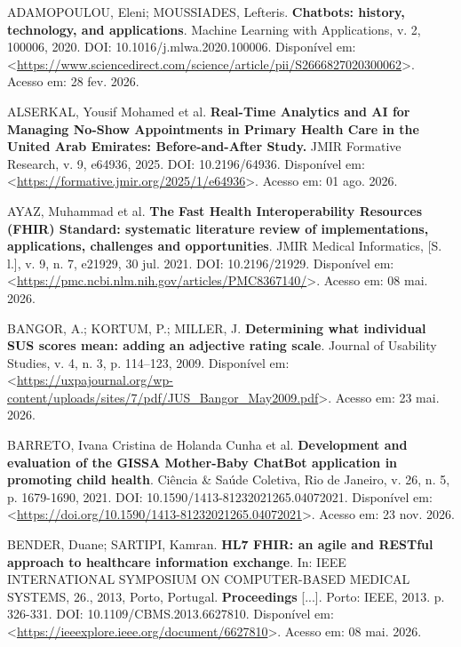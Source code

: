 \documentclass[12pt,a4paper]{extarticle}
\begin{document}
\vspace{0.5cm}\noindent
ADAMOPOULOU, Eleni; MOUSSIADES, Lefteris. \textbf{Chatbots: history, technology, and applications}. Machine Learning with Applications, v. 2, 100006, 2020. DOI: 10.1016/j.mlwa.2020.100006. Disponível em: <\url{https://www.sciencedirect.com/science/article/pii/S2666827020300062}>. Acesso em: 28 fev. 2026.

\vspace{0.5cm}\noindent
ALSERKAL, Yousif Mohamed et al. \textbf{Real-Time Analytics and AI for Managing No-Show Appointments in Primary Health Care in the United Arab Emirates: Before-and-After Study.} JMIR Formative Research, v. 9, e64936, 2025. DOI: 10.2196/64936. Disponível em: <\url{https://formative.jmir.org/2025/1/e64936}>. Acesso em: 01 ago. 2026.

\vspace{0.5cm}\noindent
AYAZ, Muhammad et al. \textbf{The Fast Health Interoperability Resources (FHIR) Standard: systematic literature review of implementations, applications, challenges and opportunities}. JMIR Medical Informatics, [S. l.], v. 9, n. 7, e21929, 30 jul. 2021. DOI: 10.2196/21929. Disponível em: <\url{https://pmc.ncbi.nlm.nih.gov/articles/PMC8367140/}>. Acesso em: 08 mai. 2026.

\vspace{0.5cm}\noindent
BANGOR, A.; KORTUM, P.; MILLER, J. \textbf{Determining what individual SUS scores mean: adding an adjective rating scale}. Journal of Usability Studies, v. 4, n. 3, p. 114–123, 2009. Disponível em:<\url{https://uxpajournal.org/wp-content/uploads/sites/7/pdf/JUS_Bangor_May2009.pdf}>. Acesso em: 23 mai. 2026.

\vspace{0.5cm}\noindent
BARRETO, Ivana Cristina de Holanda Cunha et al. \textbf{Development and evaluation of the GISSA Mother-Baby ChatBot application in promoting child health}. Ciência \& Saúde Coletiva, Rio de Janeiro, v. 26, n. 5, p. 1679-1690, 2021. DOI: 10.1590/1413-81232021265.04072021. Disponível em: <\url{https://doi.org/10.1590/1413-81232021265.04072021}>. Acesso em: 23 nov. 2026.

\vspace{0.5cm}\noindent
BENDER, Duane; SARTIPI, Kamran. \textbf{HL7 FHIR: an agile and RESTful approach to healthcare information exchange}. In: IEEE INTERNATIONAL SYMPOSIUM ON COMPUTER-BASED MEDICAL SYSTEMS, 26., 2013, Porto, Portugal. \textbf{Proceedings} [...]. Porto: IEEE, 2013. p. 326-331. DOI: 10.1109/CBMS.2013.6627810. Disponível em: <\url{https://ieeexplore.ieee.org/document/6627810}>. Acesso em: 08 mai. 2026.
\end{document}
